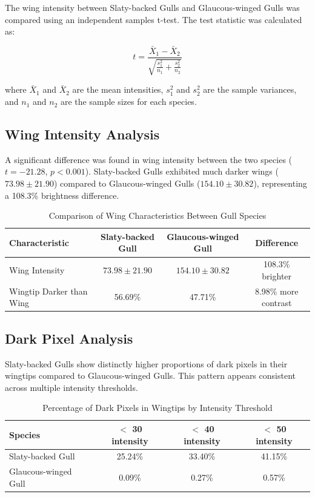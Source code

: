 \documentclass[a4paper,12pt]{report}
\begin{document}
The wing intensity between Slaty-backed Gulls and Glaucous-winged Gulls was compared using an independent samples t-test. The test statistic was calculated as:

\begin{equation}
t = \frac{\bar{X}_1 - \bar{X}_2}{\sqrt{\frac{s_1^2}{n_1} + \frac{s_2^2}{n_2}}}
\end{equation}

where $\bar{X}_1$ and $\bar{X}_2$ are the mean intensities, $s_1^2$ and $s_2^2$ are the sample variances, and $n_1$ and $n_2$ are the sample sizes for each species.

\subsection{Wing Intensity Analysis}

A significant difference was found in wing intensity between the two species ($t = -21.28$, $p < 0.001$). Slaty-backed Gulls exhibited much darker wings ($73.98 \pm 21.90$) compared to Glaucous-winged Gulls ($154.10 \pm 30.82$), representing a 108.3\% brightness difference.

\begin{table}[H]
\centering
\caption{Comparison of Wing Characteristics Between Gull Species}
\label{tab:wing_comparison}
\begin{tabular}{lccc}
\toprule
\textbf{Characteristic} & \textbf{Slaty-backed Gull} & \textbf{Glaucous-winged Gull} & \textbf{Difference} \\
\midrule
Wing Intensity & $73.98 \pm 21.90$ & $154.10 \pm 30.82$ & 108.3\% brighter \\
Wingtip Darker than Wing & 56.69\% & 47.71\% & 8.98\% more contrast \\
\bottomrule
\end{tabular}
\end{table}

\subsection{Dark Pixel Analysis}

Slaty-backed Gulls show distinctly higher proportions of dark pixels in their wingtips compared to Glaucous-winged Gulls. This pattern appears consistent across multiple intensity thresholds.

\begin{table}[H]
\centering
\caption{Percentage of Dark Pixels in Wingtips by Intensity Threshold}
\label{tab:dark_pixels}
\begin{tabular}{lccc}
\toprule
\textbf{Species} & \textbf{$<$ 30 intensity} & \textbf{$<$ 40 intensity} & \textbf{$<$ 50 intensity} \\
\midrule
Slaty-backed Gull & 25.24\% & 33.40\% & 41.15\% \\
Glaucous-winged Gull & 0.09\% & 0.27\% & 0.57\% \\
\bottomrule
\end{tabular}
\end{table}
\end{document}
